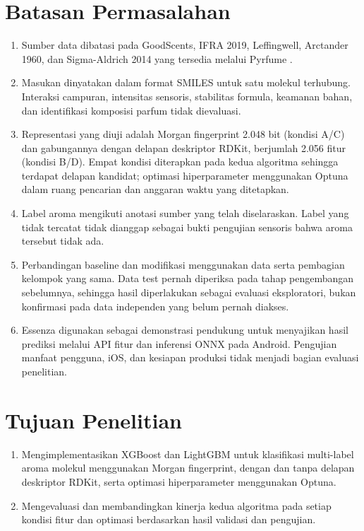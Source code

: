 \section{Batasan Permasalahan}

\begin{enumerate}
    \item Sumber data dibatasi pada GoodScents, IFRA 2019, Leffingwell, Arctander 1960, dan Sigma-Aldrich 2014 yang tersedia melalui Pyrfume \cite{hamel2024,pyrfumeFive2026}.
    \item Masukan dinyatakan dalam format SMILES untuk satu molekul terhubung. Interaksi campuran, intensitas sensoris, stabilitas formula, keamanan bahan, dan identifikasi komposisi parfum tidak dievaluasi.
    \item Representasi yang diuji adalah Morgan fingerprint 2.048 bit (kondisi A/C) dan gabungannya dengan delapan deskriptor RDKit, berjumlah 2.056 fitur (kondisi B/D). Empat kondisi diterapkan pada kedua algoritma sehingga terdapat delapan kandidat; optimasi hiperparameter menggunakan Optuna dalam ruang pencarian dan anggaran waktu yang ditetapkan.
    \item Label aroma mengikuti anotasi sumber yang telah diselaraskan. Label yang tidak tercatat tidak dianggap sebagai bukti pengujian sensoris bahwa aroma tersebut tidak ada.
    \item Perbandingan baseline dan modifikasi menggunakan data serta pembagian kelompok yang sama. Data test pernah diperiksa pada tahap pengembangan sebelumnya, sehingga hasil diperlakukan sebagai evaluasi eksploratori, bukan konfirmasi pada data independen yang belum pernah diakses.
    \item Essenza digunakan sebagai demonstrasi pendukung untuk menyajikan hasil prediksi melalui API fitur dan inferensi ONNX pada Android. Pengujian manfaat pengguna, iOS, dan kesiapan produksi tidak menjadi bagian evaluasi penelitian.
\end{enumerate}

\section{Tujuan Penelitian}

\begin{enumerate}
    \item Mengimplementasikan XGBoost dan LightGBM untuk klasifikasi multi-label aroma molekul menggunakan Morgan fingerprint, dengan dan tanpa delapan deskriptor RDKit, serta optimasi hiperparameter menggunakan Optuna.
    \item Mengevaluasi dan membandingkan kinerja kedua algoritma pada setiap kondisi fitur dan optimasi berdasarkan hasil validasi dan pengujian.
\end{enumerate}

